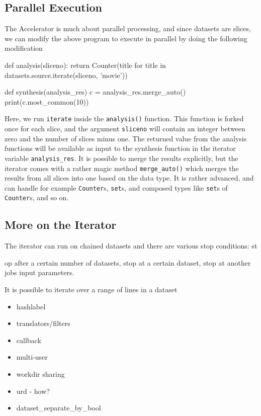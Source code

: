 \documentclass[a4paper]{article}
\begin{document}
\subsection{Parallel Execution}
The Accelerator is much about parallel processing, and since datasets
are slices, we can modify the above program to execute in parallel by
doing the following modification
\begin{python}
def analysis(sliceno):
    return Counter(title for title in datasets.source.iterate(sliceno, 'movie'))

def synthesis(analysis_res)
    c = analysis_res.merge_auto()
    print(c.most_common(10))
\end{python}
Here, we run \texttt{iterate} inside the \texttt{analysis()} function.
This function is forked once for each slice, and the argument
\texttt{sliceno} will contain an integer between zero and the number
of slices minus one.  The returned value from the analysis functions
will be available as input to the synthesis function in the iterator
variable \texttt{analysis\_res}.  It is possible to merge the results
explicitly, but the iterator comes with a rather magic method
\texttt{merge\_auto()} which merges the results from all slices into
one based on the data type.  It is rather advanced, and can handle for
example \texttt{Counter}s, \texttt{set}s, and composed types like
\texttt{set}s of \texttt{Counter}s, and so on.

\clearpage


\subsection{More on the Iterator}
The iterator can run on chained datasets and there are various stop
conditions: st

op after a certain number of datasets, stop at a certain
dataset, stop at another jobs input parameters.

It is possible to iterate over a range of lines in a dataset
\begin{itemize}
\item[] hashlabel
\item[] translators/filters
\item[] callback
\item[] multi-user
\item[] workdir sharing
\item[] urd - how?
\item[] dataset\_separate\_by\_bool\end{itemize}
\end{document}

